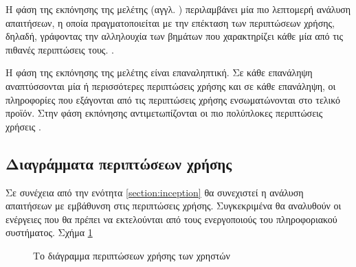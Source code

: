 \documentclass{assignment}
\begin{document}
Η φάση της εκπόνησης της μελέτης (αγγλ. ) περιλαμβάνει μία πιο λεπτομερή ανάλυση απαιτήσεων, η οποία πραγματοποιείται με την επέκταση των περιπτώσεων χρήσης, δηλαδή, γράφοντας την αλληλουχία των βημάτων που χαρακτηρίζει κάθε μία από τις πιθανές περιπτώσεις τους.  \cite{wazlawick2014object}.  
	
Η φάση της εκπόνησης της μελέτης είναι επαναληπτική. Σε κάθε επανάληψη αναπτύσσονται μία ή περισσότερες περιπτώσεις χρήσης και σε κάθε επανάληψη, οι πληροφορίες που εξάγονται από τις περιπτώσεις χρήσης ενσωματώνονται στο τελικό προϊόν. Στην φάση εκπόνησης αντιμετωπίζονται οι πιο πολύπλοκες περιπτώσεις χρήσεις \cite{wazlawick2014object}.

\subsection{Διαγράμματα περιπτώσεων χρήσης}

Σε συνέχεια από την ενότητα \ref{section:inception} θα συνεχιστεί η ανάλυση απαιτήσεων με εμβάθυνση στις περιπτώσεις χρήσης. Συγκεκριμένα θα αναλυθούν οι ενέργειες που θα πρέπει να εκτελούνται από τους ενεργοποιούς του πληροφοριακού συστήματος. 
Σχήμα \ref{fig:usecase_diagram_Users}
\begin{landscape}
\begin{figure}
\begin{center}
\caption{Το διάγραμμα περιπτώσεων χρήσης των χρηστών}
\label{fig:usecase_diagram_Users}
\end{center}
\end{figure}
\end{landscape}
\end{document}
